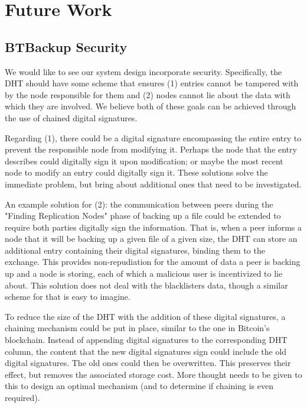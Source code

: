 \documentclass[12pt]{report}
\begin{document}
\section{Future Work}

\subsection{BTBackup Security} \label{subsec:BTBackupSecurity}

We would like to see our system design incorporate security. Specifically, the DHT should have some scheme that ensures (1) entries cannot be tampered with by the node responsible for them and (2) nodes cannot lie about the data with which they are involved. We believe both of these goals can be achieved through the use of chained digital signatures.

Regarding (1), there could be a digital signature encompassing the entire entry to prevent the responsible node from modifying it. Perhaps the node that the entry describes could digitally sign it upon modification; or maybe the most recent node to modify an entry could digitally sign it. These solutions solve the immediate problem, but bring about additional ones that need to be investigated.

An example solution for (2): the communication between peers during the "Finding Replication Nodes" phase of backing up a file could be extended to require both parties digitally sign the information. That is, when a peer informs a node that it will be backing up a given file of a given size, the DHT can store an additional entry containing their digital signatures, binding them to the exchange. This provides non-repudiation for the amount of data a peer is backing up and a node is storing, each of which a malicious user is incentivized to lie about. This solution does not deal with the blacklisters data, though a similar scheme for that is easy to imagine.

To reduce the size of the DHT with the addition of these digital signatures, a chaining mechanism could be put in place, similar to the one in Bitcoin's blockchain. Instead of appending digital signatures to the corresponding DHT column, the content that the new digital signatures sign could include the old digital signatures. The old ones could then be overwritten. This preserves their effect, but removes the associated storage cost. More thought needs to be given to this to design an optimal mechanism (and to determine if chaining is even required).
\end{document}

